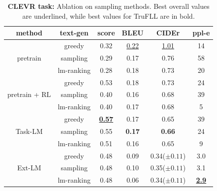 \documentclass{article}
\begin{document}
\begin{table}[htb]
\caption{\small \textbf{CLEVR task:} Ablation on sampling methods. Best overall values are underlined, while best values for TruFLL are in bold.
}
\label{app:table:abl:CLEVR_text_gen_sweep}
\centering 
\small
\begin{tabularx}{0.6\textwidth}{cc|c|ccc}
method & text-gen & score & BLEU & CIDEr
& ppl-e \\\toprule
          & greedy &  0.32 &  \underline{0.22} & \underline{1.01} & 14 \\
pretrain & sampling &  0.29 &  0.17 &  0.76 & 58 \\
         & lm-ranking & 0.28 &  0.18 &  0.73 & 20 \\
\midrule
 & greedy & 0.53 &  0.18 &  0.73 & 24 \\
pretrain + RL & sampling & 0.40 &  0.16 &  0.68 &  39 \\
 & lm-ranking & 0.40 & 0.17 &  0.68 &  5 \\
\midrule
                 & greedy & \underline{\textbf{0.57}}&0.17&0.65& 39  \\
Task-LM & sampling & 0.55&\textbf{0.17}&\textbf{0.66}& 24 \\
                 & lm-ranking &0.51&0.16&0.65& 9 \\
\midrule
            & greedy & 0.48&	0.09&	0.34\scriptsize{($\pm 0.11$)}&	3.0	 \\
Ext-LM & sampling & 0.48&	0.10 &	0.35\scriptsize{($\pm 0.11$)}&	3.1 \\
            & lm-ranking & 0.48&	0.06&	0.34\scriptsize{($\pm 0.11$)}&	\underline{\textbf{2.9}} \\
\bottomrule
\end{tabularx}
\end{table}
\end{document}
